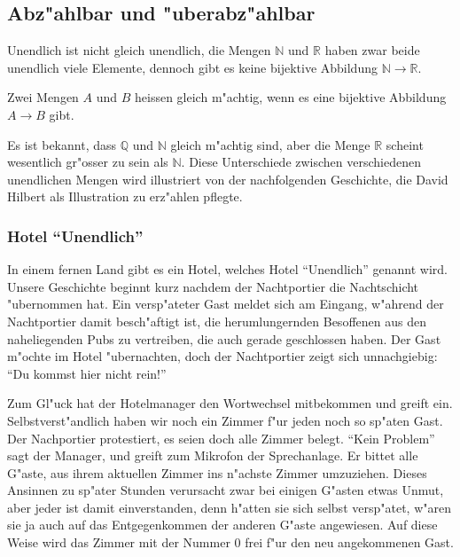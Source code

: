 \subsection{Abz"ahlbar und "uberabz"ahlbar}
Unendlich ist nicht gleich unendlich, die Mengen $\mathbb N$ und
$\mathbb R$ haben zwar beide unendlich viele Elemente, dennoch
gibt es keine bijektive Abbildung $\mathbb N\to \mathbb R$.

\begin{definition}
Zwei Mengen $A$ und $B$ heissen gleich m"achtig, wenn es eine bijektive
Abbildung $A\to B$ gibt.
\end{definition}

Es ist bekannt, dass $\mathbb Q$ und $\mathbb N$ gleich m"achtig sind,
aber die Menge $\mathbb R$ scheint wesentlich gr"osser
zu sein als $\mathbb N$.
Diese Unterschiede zwischen verschiedenen
unendlichen Mengen wird illustriert von der nachfolgenden Geschichte,
die David Hilbert als Illustration zu erz"ahlen pflegte.

\subsubsection{Hotel ``Unendlich''}
In einem fernen Land gibt es ein Hotel, welches Hotel ``Unendlich''
genannt wird. Unsere Geschichte beginnt kurz nachdem der Nachtportier
die Nachtschicht "ubernommen hat. Ein versp"ateter Gast meldet sich
am Eingang, w"ahrend der Nachtportier damit besch"aftigt ist,
die herumlungernden Besoffenen
aus den naheliegenden Pubs zu vertreiben, die auch gerade geschlossen haben.
Der Gast m"ochte im Hotel "ubernachten, doch der Nachtportier zeigt sich
unnachgiebig: ``Du kommst hier nicht rein!''

Zum Gl"uck hat der Hotelmanager den Wortwechsel mitbekommen und greift
ein. Selbstverst"andlich haben wir noch ein Zimmer f"ur jeden noch so
sp"aten Gast. Der Nachportier protestiert, es seien doch alle Zimmer
belegt. ``Kein Problem'' sagt der Manager, und greift zum Mikrofon
der Sprechanlage. Er bittet alle G"aste, aus ihrem aktuellen Zimmer
ins n"achste Zimmer umzuziehen. Dieses Ansinnen zu sp"ater Stunden
verursacht zwar bei einigen G"asten etwas Unmut, aber jeder ist damit
einverstanden, denn h"atten sie sich selbst versp"atet, w"aren sie ja
auch auf das Entgegenkommen der anderen G"aste angewiesen. Auf diese
Weise wird das Zimmer mit der Nummer $0$ frei f"ur den neu angekommenen
Gast.

